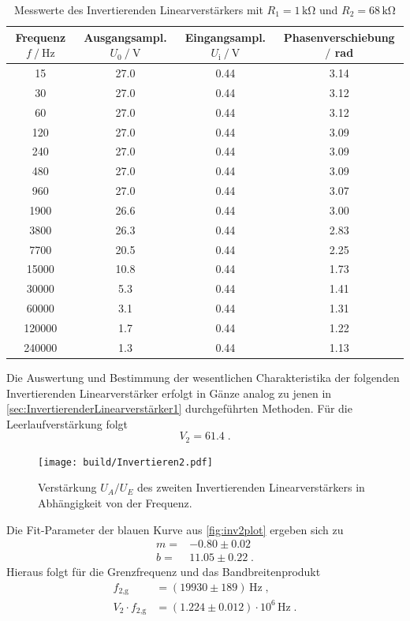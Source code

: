 \begin{table}
    \centering
    \caption{Messwerte des Invertierenden Linearverstärkers mit $R_1=1\,\unit{\kilo\ohm}$ und $R_2=68\,\unit{\kilo\ohm}$}
    \begin{tabular}{c c c c}
        \toprule
        Frequenz $f\mathbin{/}\unit{\hertz}$ & Ausgangsampl. $U_0\mathbin{/}\unit{\volt}$& Eingangsampl. $U_{\text{i}}\mathbin{/}\unit{\volt}$ & Phasenverschiebung $\mathbin{/}$ rad\\
        \midrule
        15&	27.0&	0.44&	3.14\\		    
        30&	27.0&	0.44&	3.12\\		
        60&	27.0&	0.44&	3.12\\		
        120&	27.0&	0.44&	3.09\\		
        240&	27.0&	0.44&	3.09\\		
        480	&27.0&	0.44&	3.09\\		
        960	&27.0&	0.44&	3.07\\		
        1900&	26.6&	0.44&	3.00\\	
        3800& 26.3&	0.44&	2.83\\	
        7700&	20.5&	0.44&	2.25\\	
        15000&	10.8&	0.44&	1.73\\	
        30000&	5.3&	0.44&	1.41	\\	
        60000&	3.1	&0.44&	1.31	\\	
        120000&	1.7	&0.44&	1.22	\\	
        240000&	1.3	&0.44&	1.13	\\
        \bottomrule
    \end{tabular}
    \label{tab:InvAmp2}
\end{table}
Die Auswertung und Bestimmung der wesentlichen Charakteristika der folgenden Invertierenden Linearverstärker erfolgt in Gänze analog zu jenen in \autoref{sec:InvertierenderLinearverstärker1} durchgeführten Methoden.
Für die Leerlaufverstärkung folgt
\begin{equation*}
    V_2= 61.4\; .
\end{equation*}
\begin{figure}
    \centering
    \texttt{[image: build/Invertieren2.pdf]}
    \caption{Verstärkung $U_A/U_E$ des zweiten Invertierenden Linearverstärkers in Abhängigkeit von der Frequenz.}
    \label{fig:inv2plot}
\end{figure}
Die Fit-Parameter der blauen Kurve aus \autoref{fig:inv2plot} ergeben sich zu
\begin{align*}
    m=&-0.80\pm 0.02 \\
    b=& 11.05\pm 0.22\; .
\end{align*}
Hieraus folgt für die Grenzfrequenz und das Bandbreitenprodukt
\begin{align*}
    f_{2\text{,g}}&= (19930 \pm 189 )\, \unit{\hertz}\; ,\\
    V_2\cdot f_{2\text{,g}}&=(1.224\pm 0.012)\cdot 10^{6}\, \unit{\hertz}\;.
\end{align*}
